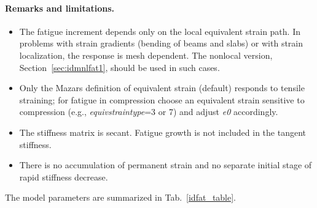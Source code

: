 \documentclass[a4paper]{article}
\begin{document}
\paragraph{Remarks and limitations.}
\begin{itemize}
\item The fatigue increment depends only on the local equivalent strain path. In problems with strain gradients
(bending of beams and slabs) or with strain localization, the response is mesh dependent. The nonlocal version,
Section~\ref{sec:idmnlfat1}, should be used in such cases.
\item Only the Mazars definition of equivalent strain (default) responds to tensile straining; for fatigue in
compression choose an equivalent strain sensitive to compression (e.g., {\it equivstraintype}=3 or 7) and adjust {\it e0} accordingly.
\item The stiffness matrix is secant. Fatigue growth is not included in the tangent stiffness.
\item There is no accumulation of permanent strain and no separate initial stage of rapid stiffness decrease.
\end{itemize}

The model parameters are summarized in Tab.~\ref{idfat_table}.
\end{document}

